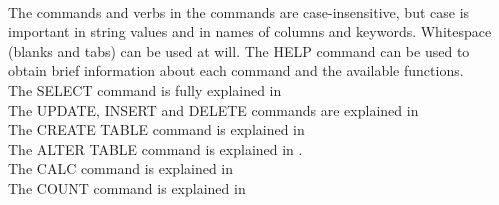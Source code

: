 \paragraph*{}
The commands and verbs in the commands are
case-insensitive, but case is important in string values and
in names of columns and keywords. Whitespace (blanks and tabs) can
be used at will. The HELP command can be used to obtain brief
information about each command and the available functions.
\\The SELECT command is fully explained in
\\The UPDATE, INSERT and DELETE commands are explained in
\\The CREATE TABLE command is explained in 
\\The ALTER TABLE command is explained in 
.
\\The CALC command is explained in
\\The COUNT command is explained in 

